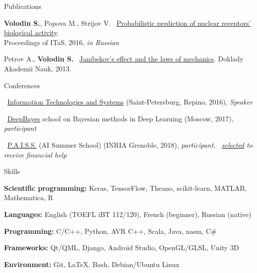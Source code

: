 \documentclass{resume} %
\begin{document}
\begin{rSection}{Publications}
\vspace{-1em}
\item {\bf Volodin S.}, Popova M., Strijov V. \faExternalLink~\href{http://itas2016.iitp.ru/pdf/1570303389.pdf}{Probabilistic prediction of nuclear receptors’ biological activity}.\\ Proceedings of ITaS, 2016, {\em in Russian}
\item Petrov A., {\bf Volodin S.} \faExternalLink~\href{https://link.springer.com/article/10.1134/S1028335813080041}{Janibekov's effect and the laws of mechanics}. Doklady Akademii Nauk, 2013.
\end{rSection}

\newpage

\begin{rSection}{Conferences}
\vspace{-1em}
\item \faExternalLink~\href{http://iitp.ru/en/conferences/itas}{Information Technologies and Systems} (Saint-Petersburg, Repino, 2016){, \em Speaker}
\item \faExternalLink~\href{http://deepbayes.ru}{DeepBayes} school on Bayesian methods in Deep Learning (Moscow, 2017){, \em participant}
\item \faExternalLink~\href{https://project.inria.fr/paiss/}{P.A.I.S.S.} (AI Summer School) (INRIA Grenoble, 2018){, \em participant, \faExternalLink~\href{http://www.europe.naverlabs.com/Blog/Students-at-PAISS}{selected} to receive financial help }
\end{rSection}

\begin{rSection}{Skills}
	\vspace{-1em}
	\item {\bf Scientific programming:} Keras, TensorFlow, Theano, scikit-learn, MATLAB, Mathematica, R
	\item {\bf Languages:} English (TOEFL iBT 112/120), French (beginner), Russian (native)
	\item {\bf Programming:} C/C++, Python, AVR C++, Scala, Java, nasm, C\#
	\item {\bf Frameworks:} Qt/QML, Django, Android Studio, OpenGL/GLSL, Unity 3D
	\item {\bf Environment:} Git, \LaTeX, Bash, Debian/Ubuntu Linux
\end{rSection}
\end{document}
